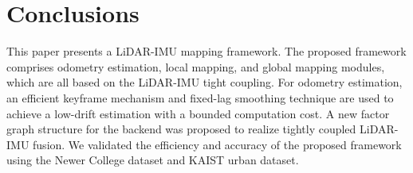 \documentclass[letterpaper, 10 pt, conference]{ieeeconf}  %
\begin{document}
\section{Conclusions}

This paper presents a LiDAR-IMU mapping framework. The proposed framework comprises odometry estimation, local mapping, and global mapping modules, which are all based on the LiDAR-IMU tight coupling. For odometry estimation, an efficient keyframe mechanism and fixed-lag smoothing technique are used to achieve a low-drift estimation with a bounded computation cost. A new factor graph structure for the backend was proposed to realize tightly coupled LiDAR-IMU fusion. We validated the efficiency and accuracy of the proposed framework using the Newer College dataset and KAIST urban dataset.

\balance



\end{document}
